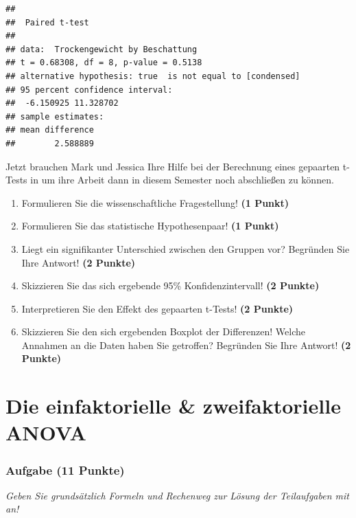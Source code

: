 \documentclass[a4paper, 9pt]{scrartcl}\usepackage[]{graphicx}\usepackage[]{xcolor}
\makeatletter
\newenvironment{kframe}{%
 \def\at@end@of@kframe{}%
 \ifinner\ifhmode%
  \def\at@end@of@kframe{\end{minipage}}%
  \begin{minipage}{\columnwidth}%
 \fi\fi%
 \def\FrameCommand##1{\hskip\@totalleftmargin \hskip-\fboxsep
 \colorbox{shadecolor}{##1}\hskip-\fboxsep
     \hskip-\linewidth \hskip-\@totalleftmargin \hskip\columnwidth}%
 \MakeFramed {\advance\hsize-\width
   \@totalleftmargin\z@ \linewidth\hsize
   \@setminipage}}%
 {\par\unskip\endMakeFramed%
 \at@end@of@kframe}
\newenvironment{knitrout}{}{} %
\makeatother
\begin{document}
\begin{knitrout}
\color{fgcolor}\begin{kframe}
\begin{verbatim}
## 
## 	Paired t-test
## 
## data:  Trockengewicht by Beschattung
## t = 0.68308, df = 8, p-value = 0.5138
## alternative hypothesis: true  is not equal to [condensed]
## 95 percent confidence interval:
##  -6.150925 11.328702
## sample estimates:
## mean difference 
##        2.588889
\end{verbatim}
\end{kframe}
\end{knitrout}

Jetzt brauchen Mark und Jessica Ihre Hilfe bei der Berechnung eines gepaarten t-Tests in \Rlogo um ihre Arbeit dann in diesem Semester noch abschließen zu können.

\begin{enumerate}
  \item Formulieren Sie die wissenschaftliche Fragestellung! \textbf{(1 Punkt)}
  \item Formulieren Sie das statistische Hypothesenpaar! \textbf{(1 Punkt)}
\item Liegt ein signifikanter Unterschied zwischen den Gruppen vor?
  Begründen Sie Ihre Antwort! \textbf{(2 Punkte)}
\item Skizzieren Sie das sich ergebende 95\% Konfidenzintervall! \textbf{(2 Punkte)}
\item Interpretieren Sie den Effekt des gepaarten t-Tests! \textbf{(2 Punkte)}
\item Skizzieren Sie den sich ergebenden Boxplot der Differenzen! Welche Annahmen an die Daten haben Sie getroffen? Begründen Sie Ihre Antwort! \textbf{(2 Punkte)} 
\end{enumerate}
 
\clearpage
\part{Die einfaktorielle \& zweifaktorielle ANOVA}

\section{Aufgabe \hfill (11 Punkte)}

\textit{Geben Sie grundsätzlich Formeln und Rechenweg zur Lösung der Teilaufgaben mit an!} \\[1Ex]
 
\end{document}
